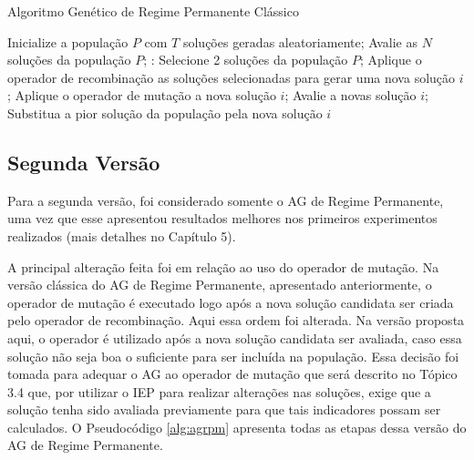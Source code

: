 \begin{algorithm}[H]
  \caption{Algoritmo Genético de Regime Permanente Clássico}
  \label{alg:agrpc}
  \begin{algorithmic}
    \State Inicialize a população $P$ com $T$ soluções geradas aleatoriamente;
    \State Avalie as $N$ soluções da população $P$;
       \State:
        \State Selecione 2 soluções da população $P$;
        \State Aplique o operador de recombinação as soluções selecionadas para gerar uma nova solução $i$;
        \State Aplique o operador de mutação a nova solução $i$;
        \State Avalie a novas solução $i$;
          \State Substitua a pior solução da população pela nova solução $i$	
        \EndIf
      \EndFor
    \EndWhile
  \end{algorithmic}
\end{algorithm}

\subsection{Segunda Versão}

Para a segunda versão, foi considerado somente o AG de Regime Permanente, uma vez que esse apresentou resultados melhores nos primeiros experimentos realizados (mais detalhes no Capítulo 5). 

A principal alteração feita foi em relação ao uso do operador de mutação. Na versão clássica do AG de Regime Permanente, apresentado anteriormente, o operador de mutação é executado logo após a nova solução candidata ser criada pelo operador de recombinação. Aqui essa ordem foi alterada. Na versão proposta aqui, o operador é utilizado após a nova solução candidata ser avaliada, caso essa solução não seja boa o suficiente para ser incluída na população. Essa decisão foi tomada para adequar o AG ao operador de mutação que será descrito no Tópico 3.4 que, por utilizar o IEP para realizar alterações nas soluções, exige que a solução tenha sido avaliada previamente para que tais indicadores possam ser calculados. O Pseudocódigo \ref{alg:agrpm} apresenta todas as etapas dessa versão do AG de Regime Permanente.

